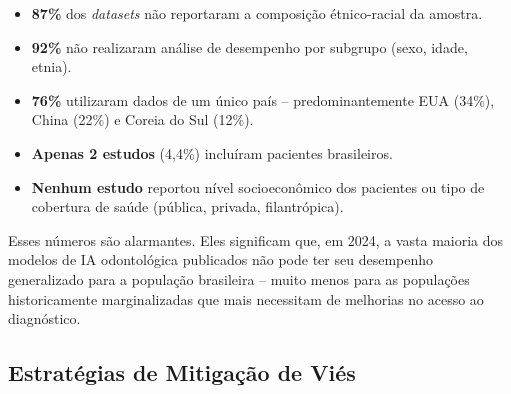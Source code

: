 \begin{itemize}
  \item \textbf{87\%} dos \textit{datasets} não reportaram a composição
    étnico-racial da amostra.
  \item \textbf{92\%} não realizaram análise de desempenho por subgrupo (sexo,
    idade, etnia).
  \item \textbf{76\%} utilizaram dados de um único país -- predominantemente
    EUA (34\%), China (22\%) e Coreia do Sul (12\%).
  \item \textbf{Apenas 2 estudos} (4,4\%) incluíram pacientes brasileiros.
  \item \textbf{Nenhum estudo} reportou nível socioeconômico dos pacientes ou
    tipo de cobertura de saúde (pública, privada, filantrópica).
\end{itemize}

Esses números são alarmantes. Eles significam que, em 2024, a vasta maioria dos
modelos de IA odontológica publicados não pode ter seu desempenho generalizado
para a população brasileira -- muito menos para as populações historicamente
marginalizadas que mais necessitam de melhorias no acesso ao diagnóstico.


\subsection{Estratégias de Mitigação de Viés}

